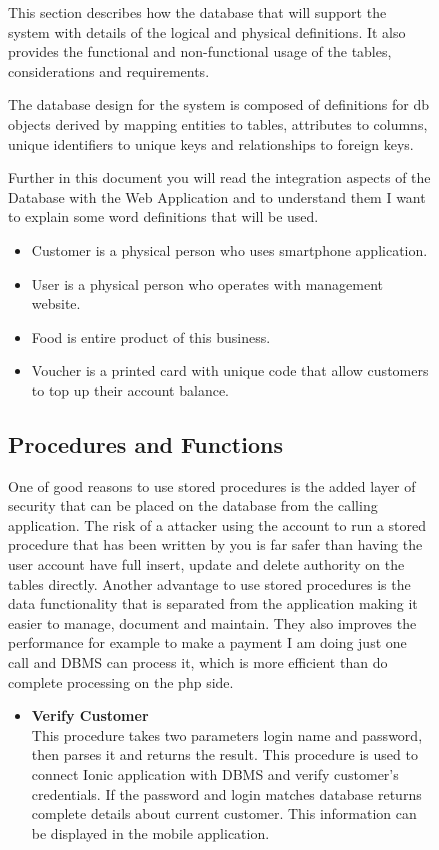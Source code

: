 \begin{figure}
This section describes how the database that will support the system with details of the logical and physical definitions. It also provides the functional and non-functional usage of the tables, considerations and requirements.

The database design for the system is composed of definitions for db objects derived by mapping entities to tables, attributes to columns, unique identifiers to unique keys and relationships to foreign keys. 

Further in this document you will read the integration aspects of the Database with the Web Application and to understand them I want to explain some word definitions that will be used.
\\
\begin{itemize}
\item Customer is a physical person who uses smartphone application.

\item User is a physical person who operates with management website.

\item Food is entire product of this business.

\item Voucher is a printed card with unique code that allow customers to top up their account balance.
\end{itemize}
    \subsection{Procedures and Functions}
One of good reasons to use stored procedures is the added layer of security that can be placed on the database from the calling application. The risk of a attacker using the account to run a stored procedure that has been written by you is far safer than having the user account have full insert, update and delete authority on the tables directly. Another advantage to use stored procedures is the data functionality that is separated from the application making it easier to manage, document and maintain. They also improves the performance for example to make a payment I am doing just one call and DBMS can process it, which is more efficient than do complete processing on the php side.
\\

\begin{itemize}
	

\item \textbf{Verify Customer}
\\
This procedure takes two parameters login name and password, then parses it and returns the result. This procedure is used to connect Ionic application with DBMS and verify customer's credentials. If the password and login matches database returns complete details about current customer. This information can be displayed in the mobile application.


\end{itemize}
\end{figure}
